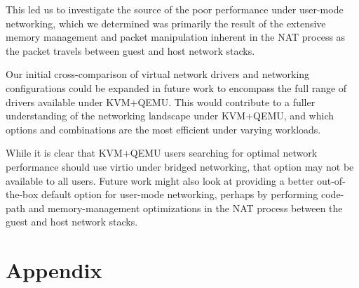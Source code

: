 \documentclass[11pt,pdftex,twocolumn]{article}
\begin{document}
This led us to investigate the source of the poor performance under user-mode networking, which we determined was primarily the result of the extensive memory management and packet manipulation inherent in the NAT process as the packet travels between guest and host network stacks.

Our initial cross-comparison of virtual network drivers and networking configurations could be expanded in future work to encompass the full range of drivers available under KVM+QEMU. This would contribute to a fuller understanding of the networking landscape under KVM+QEMU, and which options and combinations are the most efficient under varying workloads. 

While it is clear that KVM+QEMU users searching for optimal network performance should use virtio under bridged networking, that option may not be available to all users. Future work might also look at providing a better out-of-the-box default option for user-mode networking, perhaps by performing code-path and memory-management optimizations in the NAT process between the guest and host network stacks.

\section*{Appendix}
\end{document}
